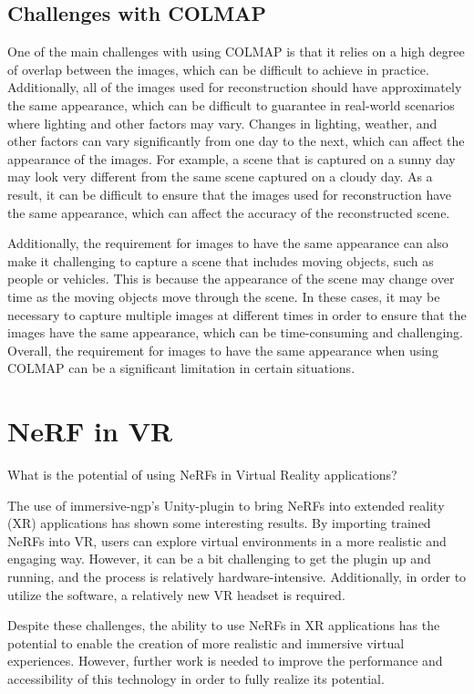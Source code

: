 \subsection{Challenges with COLMAP}
One of the main challenges with using COLMAP is that it relies on a high degree of overlap between the images, which can be difficult to achieve in practice. Additionally, all of the images used for reconstruction should have approximately the same appearance, which can be difficult to guarantee in real-world scenarios where lighting and other factors may vary. Changes in lighting, weather, and other factors can vary significantly from one day to the next, which can affect the appearance of the images. For example, a scene that is captured on a sunny day may look very different from the same scene captured on a cloudy day. As a result, it can be difficult to ensure that the images used for reconstruction have the same appearance, which can affect the accuracy of the reconstructed scene.

Additionally, the requirement for images to have the same appearance can also make it challenging to capture a scene that includes moving objects, such as people or vehicles. This is because the appearance of the scene may change over time as the moving objects move through the scene. In these cases, it may be necessary to capture multiple images at different times in order to ensure that the images have the same appearance, which can be time-consuming and challenging. Overall, the requirement for images to have the same appearance when using COLMAP can be a significant limitation in certain situations.


\section{NeRF in VR}
\begin{description}[leftmargin=!,labelwidth=\widthof{RQ 1:}]
\item[\textbf{RQ 4:}]
What is the potential of using NeRFs in Virtual Reality applications?
\end{description}

The use of immersive-ngp's Unity-plugin to bring NeRFs into extended reality (XR) applications has shown some interesting results. By importing trained NeRFs into VR, users can explore virtual environments in a more realistic and engaging way. However, it can be a bit challenging to get the plugin up and running, and the process is relatively hardware-intensive. Additionally, in order to utilize the software, a relatively new VR headset is required.

Despite these challenges, the ability to use NeRFs in XR applications has the potential to enable the creation of more realistic and immersive virtual experiences. However, further work is needed to improve the performance and accessibility of this technology in order to fully realize its potential.